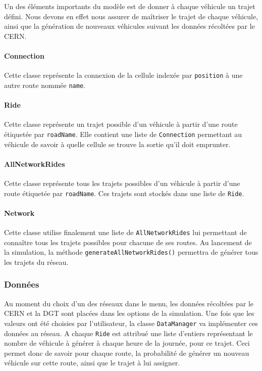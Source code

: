 \documentclass[a4paper,11pt, titlepage]{extarticle}
\begin{document}
Un des éléments importants du modèle est de donner à chaque véhicule un trajet défini. Nous devons en effet nous assurer de maîtriser le trajet de chaque véhicule, ainsi que la génération de nouveaux véhicules suivant les données récoltées par le CERN.

\paragraph{Connection}

Cette classe représente la connexion de la cellule indexée par \texttt{position} à une autre route nommée \texttt{name}.

\paragraph{Ride}

Cette classe représente un trajet possible d'un véhicule à partir d'une route étiquetée par \texttt{roadName}. Elle contient une liste de \texttt{Connection} permettant au véhicule de savoir à quelle cellule se trouve la sortie qu'il doit emprunter.

\paragraph{AllNetworkRides}

Cette classe représente tous les trajets possibles d'un véhicule à partir d'une route étiquetée par \texttt{roadName}. Ces trajets sont stockés dans une liste de \texttt{Ride}.

\paragraph{Network}

Cette classe utilise finalement une liste de \texttt{AllNetworkRides} lui permettant de connaître tous les trajets possibles pour chacune de ses routes. Au lancement de la simulation, la méthode \texttt{generateAllNetworkRides()} permettra de générer tous les trajets du réseau.

\subsubsection{Données}

Au moment du choix d'un des réseaux dans le menu, les données récoltées par le CERN et la DGT sont placées dans les options de la simulation. Une fois que les valeurs ont été choisies par l'utilisateur, la classe \texttt{DataManager} va implémenter ces données au réseau. A chaque \texttt{Ride} est attribué une liste d'entiers représentant le nombre de véhicule à générer à chaque heure de la journée, pour ce trajet. Ceci permet donc de savoir pour chaque route, la probabilité de générer un nouveau véhicule sur cette route, ainsi que le trajet à lui assigner.
\end{document}
